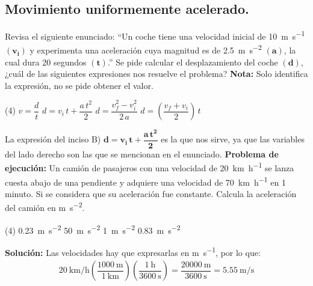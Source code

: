 \documentclass[12pt, letter]{exam}
\begin{document}


\newpage

\begin{questions}
    \section{Movimiento uniformemente acelerado.}

    \question Revisa el siguiente enunciado: \enquote{Un coche tiene una velocidad inicial de \SI{10}{\meter\per\second} $\mathbf{(v_{i})}$ y experimenta una aceleración cuya magnitud es de \SI{2.5}{\meter\per\square\second} $\mathbf{(a)}$, la cual dura \num{20} segundos $\mathbf{(t)}$.} Se pide calcular el desplazamiento del coche $\mathbf{(d)}$, ¿cuál de las siguientes expresiones nos resuelve el problema? \textbf{Nota: } Solo identifica la expresión, no se pide obtener el valor.
    \begin{tasks}(4)
        \task $v = \dfrac{d}{t}$
        \task $d = v_{i} \, t + \dfrac{a \, t^{2}}{2}$
        \task $d = \dfrac{v_{f}^{2} - v_{i}^{2}}{2 \, a}$
        \task $d = \left( \dfrac{v_{f} + v_{i}}{2} \right) \, t$
    \end{tasks}
    La expresión del inciso B) $\mathbf{d = v_{i} \, t + \dfrac{a \, t^{2}}{2}}$ es la que nos sirve, ya que las variables del lado derecho son las que se mencionan en el enunciado.
    \question \label{Problema_01} \textbf{Problema de ejecución:} Un camión de pasajeros con una velocidad de \SI{20}{\kilo\meter\per\hour} se lanza cuesta abajo de una pendiente y adquiere una velocidad de \SI{70}{\kilo\meter\per\hour} en \num{1} minuto. Si se considera que su aceleración fue constante. Calcula la aceleración del camión en \unit{\meter\per\square\second}.
    \begin{tasks}(4)
        \task \SI{0.23}{\meter\per\square\second}
        \task \SI{50}{\meter\per\square\second}
        \task \SI{1}{\meter\per\square\second}
        \task \SI{0.83}{\meter\per\square\second}
    \end{tasks}
    \textbf{Solución:} Las velocidades hay que expresarlas en \unit{\meter\per\second}, por lo que:
    \begin{align*}
    \SI[per-mode=fraction]{20}{\kilo\meter\per\hour} \left( \dfrac{\SI{1000}{\meter}}{\SI{1}{\kilo\meter}} \right) \left( \dfrac{\SI{1}{\hour}}{\SI{3600}{\second}} \right) = \dfrac{\SI{20000}{\meter}}{\SI{3600}{\second}} = \SI[per-mode=fraction]{5.55}{\meter\per\second} \\[0.5em]

\end{align*}
\end{questions}
\end{document}
